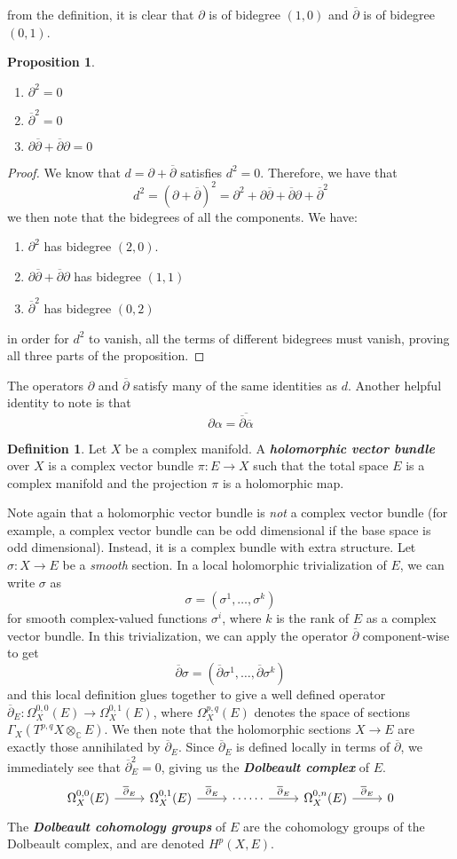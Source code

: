 \documentclass[psamsfonts, 12pt]{amsart}
\newtheorem{prop}[thm]{Proposition}
\theoremstyle{definition}
\newtheorem{defn}[thm]{Definition}
\theoremstyle{remark}
\newcommand{\ib}[1]{\textbf{\textit{#1}}}
\newcommand{\C}{\mathbb{C}}
\newcommand{\dbar}{\overline{\partial}}
\newcommand{\enumbreak}{\ \\ \vspace{-\baselineskip}}
\begin{document}
%
from the definition, it is clear that $\partial$ is of bidegree $(1,0)$ and $\dbar$ is
of bidegree $(0,1)$.
%
\begin{prop}\enumbreak
\begin{enumerate}
  \item $\partial^2 = 0$
  \item $\dbar^2 = 0$
  \item $\partial\dbar + \dbar\partial = 0$
\end{enumerate}
\end{prop}
%
\begin{proof}
We know that $d = \partial + \dbar$ satisfies $d^2 = 0$. Therefore, we have that
\[
d^2 = (\partial +\dbar)^2 = \partial^2 + \partial\dbar + \dbar\partial + \dbar^2
\]
we then note that the bidegrees of all the components. We have:
\begin{enumerate}
  \item $\partial^2$ has bidegree $(2,0)$.
  \item $\partial\dbar + \dbar\partial$ has bidegree $(1,1)$
  \item $\dbar^2$ has bidegree $(0,2)$
\end{enumerate}
in order for $d^2$ to vanish, all the terms of different bidegrees must vanish, proving
all three parts of the proposition.
\end{proof}
%
The operators $\partial$ and $\dbar$ satisfy many of the same identities as $d$. Another
helpful identity to note is that
\[
\partial\alpha = \overline{\dbar\overline{\alpha}}
\]
\begin{defn}
Let $X$ be a complex manifold. A \ib{holomorphic vector bundle} over $X$ is a
complex vector bundle $\pi : E \to X$ such that the total space $E$ is a complex manifold
and the projection $\pi$ is a holomorphic map.
\end{defn}
%
Note again that a holomorphic vector bundle is \emph{not} a complex vector bundle
(for example, a complex vector bundle can be odd dimensional if the base space is
odd dimensional). Instead, it is a complex bundle with extra structure. Let
$\sigma : X \to E$ be a \emph{smooth} section. In a local holomorphic trivialization of
$E$, we can write $\sigma$ as
\[
\sigma = (\sigma^1, \ldots, \sigma^k)
\]
for smooth complex-valued functions $\sigma^i$,  where $k$ is the rank of $E$ as a
complex vector bundle. In this trivialization, we can apply the operator $\dbar$
component-wise to get
\[
\dbar\sigma = (\dbar\sigma^1,\ldots,\dbar\sigma^k)
\]
and this local definition glues together to give a well defined operator
$\dbar_E : \Omega^{0,0}_X(E) \to \Omega^{0,1}_X(E)$, where $\Omega^{p,q}_X(E)$ denotes
the space of sections $\Gamma_X(T^{p,q}X \otimes_\C E)$. We then note that the
holomorphic sections $X \to E$ are exactly those annihilated by $\dbar_E$. Since
$\dbar_E$ is defined locally in terms of $\dbar$, we immediately see that
$\dbar_E^2 = 0$, giving us the
\ib{Dolbeault complex} of $E$.
\[\begin{tikzcd}
\Omega^{0,0}_X(E) \ar[r, "\dbar_E"] & \Omega^{0,1}_X(E) \ar[r, "\dbar_E"] &
\cdots\cdots \ar[r, "\dbar_E"] & \Omega^{0,n}_X(E) \ar[r,"\dbar_E"] & 0
\end{tikzcd}\]
%
The \ib{Dolbeault cohomology groups} of $E$ are the cohomology groups of the
Dolbeault complex, and are denoted $H^p(X,E)$.
%
\end{document}
